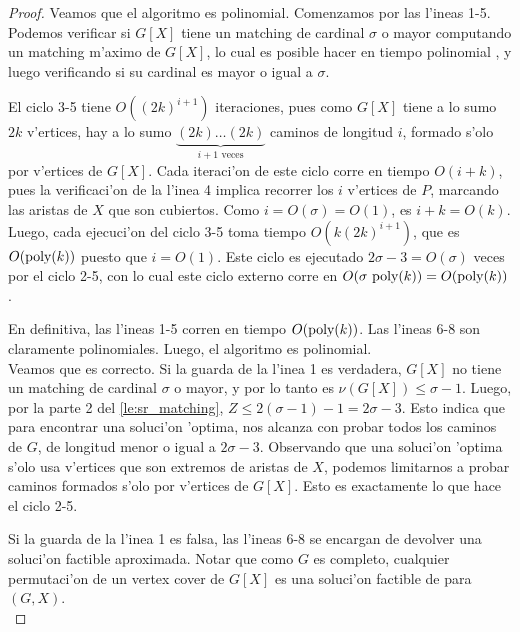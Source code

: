 \begin{theorem}
\begin{proof}
Veamos que el algoritmo es polinomial. Comenzamos por las l'ineas 1-5. Podemos verificar si $G[X]$ tiene un matching de cardinal $\sigma$ o mayor computando un matching m'aximo de $G[X]$, lo cual es posible hacer en tiempo polinomial \cite{Ed87}, y luego verificando si su cardinal es mayor o igual a $\sigma$.

El ciclo 3-5 tiene $O((2k)^{i + 1})$ iteraciones, pues como $G[X]$ tiene a lo sumo $2k$ v'ertices, hay a lo sumo $\underbrace{(2k)\dots(2k)}_{i + 1 \text{ veces}}$ caminos de longitud $i$, formado s'olo por v'ertices de $G[X]$. Cada iteraci'on de este ciclo corre en tiempo $O(i + k)$, pues la verificaci'on de la l'inea 4 implica recorrer los $i$ v'ertices de $P$, marcando las aristas de $X$ que son cubiertos. Como $i = O(\sigma) = O(1)$, es $i + k = O(k)$. Luego, cada ejecuci'on del ciclo 3-5 toma tiempo $O(k(2k)^{i + 1})$, que es $O(\textnormal{poly}(k))$ puesto que $i = O(1)$. Este ciclo es ejecutado $2\sigma - 3 = O(\sigma)$ veces por el ciclo 2-5, con lo cual este ciclo externo corre en $O(\sigma\text{ }\textnormal{poly}(k)) = O(\textnormal{poly}(k))$.

En definitiva, las l'ineas 1-5 corren en tiempo $O(\textnormal{poly}(k))$. Las l'ineas 6-8 son claramente polinomiales. Luego, el algoritmo es polinomial.\\

Veamos que es correcto. Si la guarda de la l'inea 1 es verdadera, $G[X]$ no tiene un matching de cardinal $\sigma$ o mayor, y por lo tanto es $\nu(G[X]) \leq \sigma - 1$. Luego, por la parte 2 del \autoref{le:sr_matching}, $Z \leq 2(\sigma - 1) - 1 = 2\sigma - 3$. Esto indica que para encontrar una soluci'on 'optima, nos alcanza con probar todos los caminos de $G$, de longitud menor o igual a $2\sigma - 3$. Observando que una soluci'on 'optima s'olo usa v'ertices que son extremos de aristas de $X$, podemos limitarnos a probar caminos formados s'olo por v'ertices de $G[X]$. Esto es exactamente lo que hace el ciclo 2-5. 

Si la guarda de la l'inea 1 es falsa, las l'ineas 6-8 se encargan de devolver una soluci'on factible aproximada. Notar que como $G$ es completo, cualquier permutaci'on de un vertex cover de $G[X]$ es una soluci'on factible de  para $(G, X)$.\\


\end{proof}
\end{theorem}
